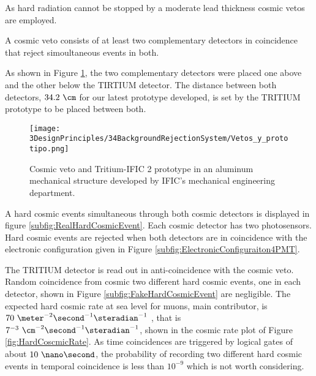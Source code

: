 As hard radiation cannot be stopped by a moderate lead thickness cosmic vetos are employed.

A cosmic veto consists of at least two complementary detectors in coincidence that reject simoultaneous events in both. 

As shown in Figure \ref{fig:VetoAndPrototype}, the two complementary detectors were placed one above and the other below the TIRTIUM detector. The distance between both detectors, $34.2~\cm$ for our latest prototype developed, is set by the TRITIUM prototype to be placed between both.

\begin{figure}[h]
\centering
\texttt{[image: 3DesignPrinciples/34BackgroundRejectionSystem/Vetos\_y\_prototipo.png]}
\caption{Cosmic veto and Tritium-IFIC 2 prototype in an aluminum mechanical structure developed by IFIC's mechanical engineering department.\label{fig:VetoAndPrototype}}
\end{figure}


A hard cosmic events simultaneous through both cosmic detectors is displayed in figure \ref{subfig:RealHardCosmicEvent}. Each cosmic detector has two photosensors. Hard cosmic events are rejected when both detectors are in coincidence with the electronic configuration given in Figure \ref{subfig:ElectronicConfiguraiton4PMT}. 

The TRITIUM detector is read out in anti-coincidence with the cosmic veto.  Random coincidence from cosmic two different hard cosmic events, one in each detector, shown in Figure \ref{subfig:FakeHardCosmicEvent} are negligible. The expected hard cosmic rate at sea level for muons, main contributor, is $70~\meter^{-2}\second^{-1}\steradian^{-1}$ \cite{PDG, HardCosmicMuonRate}, that is $7^{-3}~\cm^{-2}\second^{-1}\steradian^{-1}$, shown in the cosmic rate plot of Figure \ref{fig:HardCoscmicRate}. As time coincidences are triggered by logical gates of about $10~\nano\second$, the probability of recording two different hard cosmic events in temporal coincidence is less than $10^{-9}$ which is not worth considering.


